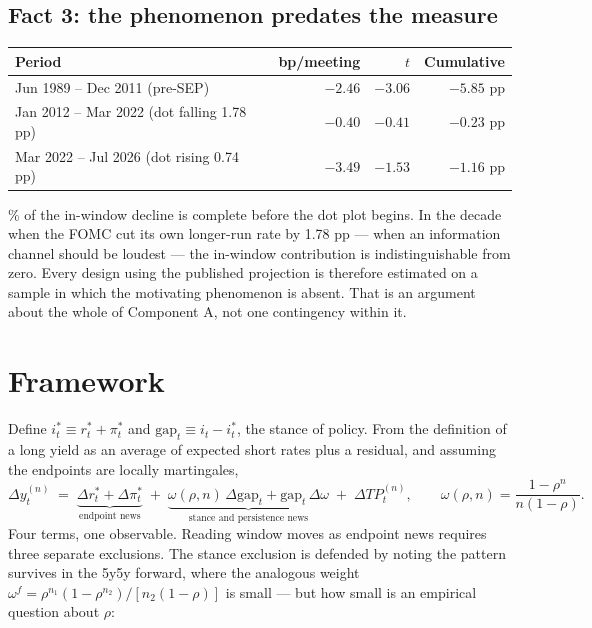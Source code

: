 \documentclass[11pt]{article}
\begin{document}
\subsection{Fact 3: the phenomenon predates the measure}

\begin{center}\small
\begin{tabular}{lrrr}
\toprule
Period & bp/meeting & $t$ & Cumulative\\ \midrule
Jun 1989 -- Dec 2011 (pre-SEP) & $-2.46$ & $-3.06$ & $\mathbf{-5.85}$ pp\\
Jan 2012 -- Mar 2022 (dot falling 1.78 pp) & $-0.40$ & $-0.41$ & $-0.23$ pp\\
Mar 2022 -- Jul 2026 (dot rising 0.74 pp) & $-3.49$ & $-1.53$ & $-1.16$ pp\\
\bottomrule\end{tabular}
\end{center}

\% of the in-window decline is complete before the dot plot begins. In the decade
when the FOMC cut its own longer-run rate by 1.78 pp --- when an information channel should be
loudest --- the in-window contribution is indistinguishable from zero. Every design using the
published projection is therefore estimated on a sample in which the motivating phenomenon is
absent. That is an argument about the whole of Component A, not one contingency within it.

\section{Framework}

Define $i^{*}_t \equiv r^{*}_t + \pi^{*}_t$ and $\text{gap}_t \equiv i_t - i^{*}_t$, the stance
of policy. From the definition of a long yield as an average of expected short rates plus a
residual, and assuming the endpoints are locally martingales,
\begin{equation}
\Delta y^{(n)}_t \;=\; \underbrace{\Delta r^{*}_t + \Delta \pi^{*}_t}_{\text{endpoint news}}
\;+\; \underbrace{\omega(\rho,n)\,\Delta\text{gap}_t + \text{gap}_t\,\Delta\omega}_{\text{stance and persistence news}}
\;+\; \Delta TP^{(n)}_t ,
\qquad \omega(\rho,n) = \frac{1-\rho^{n}}{n(1-\rho)} .
\label{eq:windowdiff}
\end{equation}
Four terms, one observable. Reading window moves as endpoint news requires three separate
exclusions. The stance exclusion is defended by noting the pattern survives in the 5y5y forward,
where the analogous weight
$\omega^{f} = \rho^{n_1}(1-\rho^{n_2})/[n_2(1-\rho)]$ is small --- but how small is an empirical
question about $\rho$:
\end{document}
